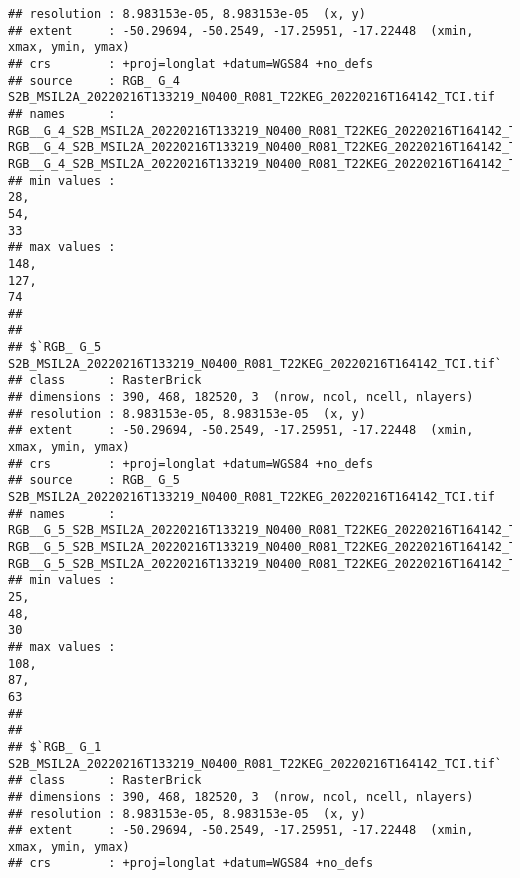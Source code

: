 \documentclass[
]{article}
\begin{document}
\begin{verbatim}
## resolution : 8.983153e-05, 8.983153e-05  (x, y)
## extent     : -50.29694, -50.2549, -17.25951, -17.22448  (xmin, xmax, ymin, ymax)
## crs        : +proj=longlat +datum=WGS84 +no_defs 
## source     : RGB_ G_4 S2B_MSIL2A_20220216T133219_N0400_R081_T22KEG_20220216T164142_TCI.tif 
## names      : RGB__G_4_S2B_MSIL2A_20220216T133219_N0400_R081_T22KEG_20220216T164142_TCI.1, RGB__G_4_S2B_MSIL2A_20220216T133219_N0400_R081_T22KEG_20220216T164142_TCI.2, RGB__G_4_S2B_MSIL2A_20220216T133219_N0400_R081_T22KEG_20220216T164142_TCI.3 
## min values :                                                                          28,                                                                          54,                                                                          33 
## max values :                                                                         148,                                                                         127,                                                                          74 
## 
## 
## $`RGB_ G_5 S2B_MSIL2A_20220216T133219_N0400_R081_T22KEG_20220216T164142_TCI.tif`
## class      : RasterBrick 
## dimensions : 390, 468, 182520, 3  (nrow, ncol, ncell, nlayers)
## resolution : 8.983153e-05, 8.983153e-05  (x, y)
## extent     : -50.29694, -50.2549, -17.25951, -17.22448  (xmin, xmax, ymin, ymax)
## crs        : +proj=longlat +datum=WGS84 +no_defs 
## source     : RGB_ G_5 S2B_MSIL2A_20220216T133219_N0400_R081_T22KEG_20220216T164142_TCI.tif 
## names      : RGB__G_5_S2B_MSIL2A_20220216T133219_N0400_R081_T22KEG_20220216T164142_TCI.1, RGB__G_5_S2B_MSIL2A_20220216T133219_N0400_R081_T22KEG_20220216T164142_TCI.2, RGB__G_5_S2B_MSIL2A_20220216T133219_N0400_R081_T22KEG_20220216T164142_TCI.3 
## min values :                                                                          25,                                                                          48,                                                                          30 
## max values :                                                                         108,                                                                          87,                                                                          63 
## 
## 
## $`RGB_ G_1 S2B_MSIL2A_20220216T133219_N0400_R081_T22KEG_20220216T164142_TCI.tif`
## class      : RasterBrick 
## dimensions : 390, 468, 182520, 3  (nrow, ncol, ncell, nlayers)
## resolution : 8.983153e-05, 8.983153e-05  (x, y)
## extent     : -50.29694, -50.2549, -17.25951, -17.22448  (xmin, xmax, ymin, ymax)
## crs        : +proj=longlat +datum=WGS84 +no_defs 

\end{verbatim}
\end{document}
